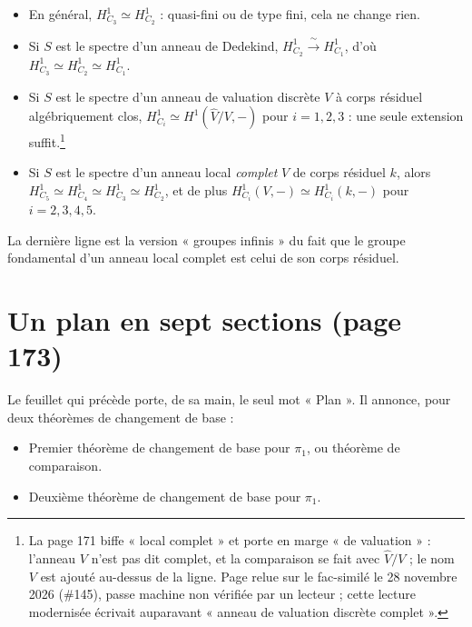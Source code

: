 \documentclass[11pt,a4paper]{article}
\begin{document}
\begin{itemize}
  \item En général, $H^{1}_{C_{3}} \simeq H^{1}_{C_{2}}$ : quasi-fini ou de
    type fini, cela ne change rien.
  \item Si $S$ est le spectre d'un anneau de Dedekind,
    $H^{1}_{C_{2}} \xrightarrow{\ \sim\ } H^{1}_{C_{1}}$, d'où
    $H^{1}_{C_{3}} \simeq H^{1}_{C_{2}} \simeq H^{1}_{C_{1}}$.
  \item Si $S$ est le spectre d'un anneau de valuation discrète $V$ à corps
    résiduel algébriquement clos, $H^{1}_{C_{i}} \simeq H^{1}(\hat{V}/V, -)$
    pour $i = 1, 2, 3$ : une seule extension suffit.\footnote{La page 171
    biffe « local complet » et porte en marge « de valuation » : l'anneau
    $V$ n'est pas dit complet, et la comparaison se fait avec $\hat{V}/V$ ;
    le nom $V$ est ajouté au-dessus de la ligne. Page relue sur le
    fac-similé le 28 novembre 2026 (\#145), passe machine non vérifiée par
    un lecteur ; cette lecture modernisée écrivait auparavant « anneau de
    valuation discrète complet ».}
  \item Si $S$ est le spectre d'un anneau local \emph{complet} $V$ de corps
    résiduel $k$, alors $H^{1}_{C_{5}} \simeq H^{1}_{C_{4}} \simeq
    H^{1}_{C_{3}} \simeq H^{1}_{C_{2}}$, et de plus
    $H^{1}_{C_{i}}(V, -) \simeq H^{1}_{C_{i}}(k, -)$ pour $i = 2,3,4,5$.
\end{itemize}

La dernière ligne est la version « groupes infinis » du fait que le groupe
fondamental d'un anneau local complet est celui de son corps résiduel.

\section*{Un plan en sept sections (page 173)}

Le feuillet qui précède porte, de sa main, le seul mot « Plan ». Il annonce,
pour deux théorèmes de changement de base :

\begin{itemize}
  \item[I] Premier théorème de changement de base pour $\pi_{1}$, ou théorème
    de comparaison.
  \item[II] Deuxième théorème de changement de base pour $\pi_{1}$.
\end{itemize}
\end{document}
